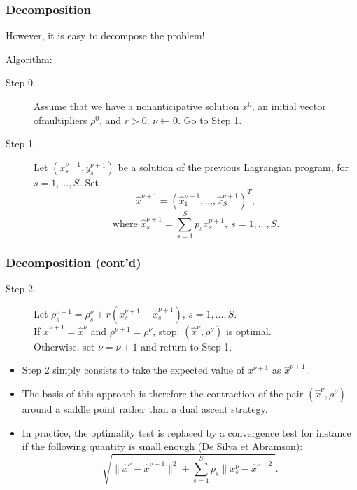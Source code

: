 \documentclass[french]{beamer}
\begin{document}
\begin{frame}
\frametitle{Decomposition}

However, it is easy to decompose the problem!

Algorithm:
\begin{description}
\item[Step 0.]
Assume that we have a nonanticipative solution $x^0$, an initial vector ofmultipliers $\rho^0$, and $r > 0$.
  $\nu \leftarrow 0$. Go to Step 1.
\item[Step 1.]
Let $\left(x_s^{\nu+1}, y_s^{\nu+1}\right)$ be a solution of the previous Lagrangian program, for $s=1,\ldots{},S$. Set
\[
\hat{x}^{\nu+1} = \left( \hat{x}_1^{\nu+1}, \ldots{}, \hat{x}_S^{\nu+1}\right)^T,
\]
\[
\mbox{where } \hat{x}_s^{\nu+1} = \sum_{s=1}^S p_s x_s^{\nu+1},\ s=1,\ldots,S.
\]
\end{description}

\end{frame}

\begin{frame}
\frametitle{Decomposition (cont'd)}

\begin{description}
\item[Step 2.]
Let $\rho^{\nu+1}_s = \rho^{\nu}_s + r\left(x_s^{\nu+1}-\hat{x}_s
^{\nu+1}\right)$, $s = 1,\ldots{}, S$.\\
If $\hat{x}^{\nu+1} = \hat{x}^{\nu}$ and $\rho^{\nu+1} = \rho^{\nu}$,
stop: $(\hat{x}^{\nu}, \rho^{\nu})$ is optimal.\\
Otherwise, set $\nu = \nu+1$ and return to Step 1.
\end{description}

\mbox{}

\begin{itemize}
\item
Step 2 simply consists to take the expected value of $x^{\nu+1}$
as $\hat{x}^{\nu+1}$.
\item
The basis of this approach is therefore the contraction of the pair $(\hat{x}^{\nu}, \rho^{\nu})$ around a saddle point rather than a dual ascent strategy.
\item
In practice, the optimality test is replaced by a convergence test for instance if the following quantity is small enough (De Silva et Abramson):
\[
\sqrt{ \| \hat{x}^{\nu} - \hat{x}^{\nu+1} \|^2 + \sum_{s = 1}^S p_s \|
  x_s^{\nu} - \hat{x}^{\nu}\|^2}.
\]
\end{itemize}

\end{frame}
\end{document}

